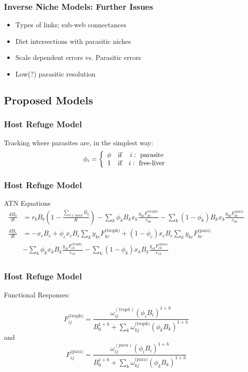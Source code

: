 \documentclass{beamer}
\begin{document}
\begin{frame}
\frametitle{Inverse Niche Models: Further Issues}
\begin{itemize}
\item <1-> Types of links; sub-web connectances
\item <2-> Diet intersections with parasitic niches
\item <3-> Scale dependent errors vs. Parasitic errors
\item <4-> Low(?) parasitic resolution
\end{itemize}
\end{frame}

\subsection{Proposed Models}
\begin{frame}
\frametitle{Host Refuge Model}
Tracking where parasites are, in the simplest way:
\begin{equation}
\phi_i = 
\left\{
\begin{array}{c c c}
\phi & \text{if} & i:\text{ parasite}\\
1 & \text{if} & i:\text{ free-liver}\\
\end{array}
\right.
\end{equation}
\end{frame}

\begin{frame}
\frametitle{Host Refuge Model}
ATN Equations
\begin{align*}
\frac{dB_{b}}{dt} &= r_bB_b\left(1-\frac{\sum_{k\in\text{basal}}B_k}{K}\right) - \sum_k\phi_kB_kx_k\frac{y_{bk}F_{bk}^\text{(troph)}}{e_{bk}} - \sum_k(1-\phi_k)B_kx_k\frac{y_{bk}F^\text{(para)}_{bk}}{e_{bk}}\\
\frac{dB_{c}}{dt} &= -x_cB_c + \phi_cx_cB_c\sum_ky_{kc}F^\text{(troph)}_{kc} + (1-\phi_c)x_cB_c\sum_ky_{kc}F^\text{(para)}_{kc} \\
&- \sum_k \phi_kx_kB_k\frac{y_{ck}F^\text{(troph)}_{ck}}{e_{ck}} - \sum_k (1-\phi_k)x_kB_k\frac{y_{ck}F^\text{(para)}_{ck}}{e_{ck}}\\
\end{align*}
\end{frame}

\begin{frame}
\frametitle{Host Refuge Model}
Functional Responses:

\begin{equation}
F_{ij}^\text{(troph)} = \frac{\omega_{ij}^{(troph)}(\phi_iB_i)^{1+h}}{B_0^{1+h} + \sum_k\omega^\text{(troph)}_{kj}(\phi_kB_k)^{1+h}} 
\end{equation}
and
\begin{equation}
F_{ij}^\text{(para)} = \frac{\omega_{ij}^{(para)}(\phi_iB_i)^{1+h}}{B_0^{1+h} + \sum_k\omega^\text{(para)}_{kj}(\phi_kB_k)^{1+h}} 
\end{equation}
\end{frame}
\end{document}
